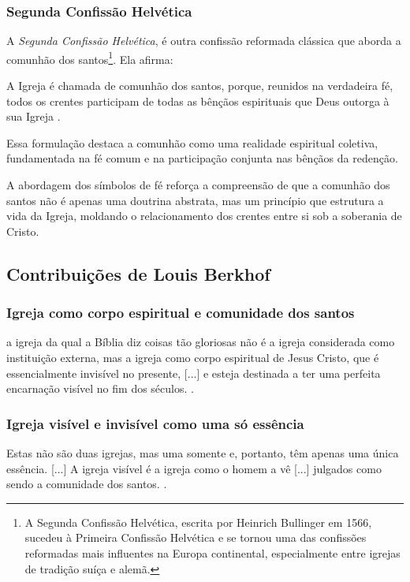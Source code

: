 \subsubsection{Segunda Confissão Helvética}
A \textit{Segunda Confissão Helvética}, é outra confissão reformada clássica que aborda a comunhão dos santos\footnote{A Segunda Confissão Helvética, escrita por Heinrich Bullinger em 1566, sucedeu à Primeira Confissão Helvética e se tornou uma das confissões reformadas mais influentes na Europa continental, especialmente entre igrejas de tradição suíça e alemã.}. Ela afirma:
\begin{citacao}
A Igreja é chamada de comunhão dos santos, porque, reunidos na verdadeira fé, todos os crentes participam de todas as bênçãos espirituais que Deus outorga à sua Igreja \cite{helvetica}.
\end{citacao}

Essa formulação destaca a comunhão como uma realidade espiritual coletiva, fundamentada na fé comum e na participação conjunta nas bênçãos da redenção.

A abordagem dos símbolos de fé reforça a compreensão de que a comunhão dos santos não é apenas uma doutrina abstrata, mas um princípio que estrutura a vida da Igreja, moldando o relacionamento dos crentes entre si sob a soberania de Cristo.

\subsection{Contribuições de Louis Berkhof}

\subsubsection{Igreja como corpo espiritual e comunidade dos santos}
\begin{citacao}
    a igreja da qual a Bíblia diz coisas tão gloriosas não é a igreja considerada como instituição externa, mas a igreja como corpo espiritual de Jesus Cristo, que é essencialmente invisível no presente, [...] e esteja destinada a ter uma perfeita encarnação visível no fim dos séculos. \cite[p. 644]{berkhof2012}.
\end{citacao}

\subsubsection{Igreja visível e invisível como uma só essência}
\begin{citacao}
Estas não são duas igrejas, mas uma somente e, portanto, têm apenas uma única essência. [...] A igreja visível é a igreja como o homem a vê [...] julgados como sendo a comunidade dos santos. \cite[p. 642]{berkhof2012}.
\end{citacao}


